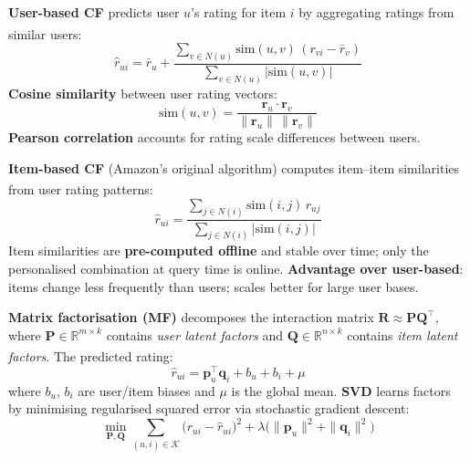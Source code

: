 \begin{tcbitemize}[ skin=sectionraster ]

    \tcbitem[title=User-Based Collaborative Filtering, raster multicolumn=3]
    \textbf{User-based CF} predicts user $u$'s rating for item $i$ by aggregating ratings from similar users\textsuperscript{\cite[][pp.~31--36]{aggarwalRecommenderSystems2016}}:
    \begin{equation}
        \hat{r}_{ui} = \bar{r}_u + \frac{\sum_{v \in N(u)} \text{sim}(u,v)\,(r_{vi} - \bar{r}_v)}{\sum_{v \in N(u)} |\text{sim}(u,v)|}
    \end{equation}
    \textbf{Cosine similarity} between user rating vectors:
    \begin{equation}
        \text{sim}(u,v) = \frac{\mathbf{r}_u \cdot \mathbf{r}_v}{\|\mathbf{r}_u\|\,\|\mathbf{r}_v\|}
    \end{equation}
    \textbf{Pearson correlation} accounts for rating scale differences between users.

    \tcbitem[title=Item-Based Collaborative Filtering, raster multicolumn=3]
    \textbf{Item-based CF} (Amazon's original algorithm) computes item--item similarities from user rating patterns\textsuperscript{\cite[][pp.~38--42]{aggarwalRecommenderSystems2016}}:
    \begin{equation}
        \hat{r}_{ui} = \frac{\sum_{j \in N(i)} \text{sim}(i,j)\,r_{uj}}{\sum_{j \in N(i)} |\text{sim}(i,j)|}
    \end{equation}
    Item similarities are \textbf{pre-computed offline} and stable over time; only the personalised combination at query time is online.
    \textbf{Advantage over user-based}: items change less frequently than users; scales better for large user bases.

    \tcbitem[title=Matrix Factorisation, raster multicolumn=3]
    \textbf{Matrix factorisation (MF)} decomposes the interaction matrix $\mathbf{R} \approx \mathbf{P}\mathbf{Q}^\top$, where $\mathbf{P} \in \mathbb{R}^{m \times k}$ contains \emph{user latent factors} and $\mathbf{Q} \in \mathbb{R}^{n \times k}$ contains \emph{item latent factors}\textsuperscript{\cite[][pp.~30--37]{korenMatrixFactorizationTechniques2009}}.
    The predicted rating:
    \begin{equation}
        \hat{r}_{ui} = \mathbf{p}_u^\top \mathbf{q}_i + b_u + b_i + \mu
    \end{equation}
    where $b_u$, $b_i$ are user/item biases and $\mu$ is the global mean.
    \textbf{SVD} learns factors by minimising regularised squared error via stochastic gradient descent:
    \begin{equation}
        \min_{\mathbf{P},\mathbf{Q}} \sum_{(u,i)\in\mathcal{K}} \bigl(r_{ui} - \hat{r}_{ui}\bigr)^2 + \lambda\bigl(\|\mathbf{p}_u\|^2 + \|\mathbf{q}_i\|^2\bigr)
    \end{equation}


\end{tcbitemize}
